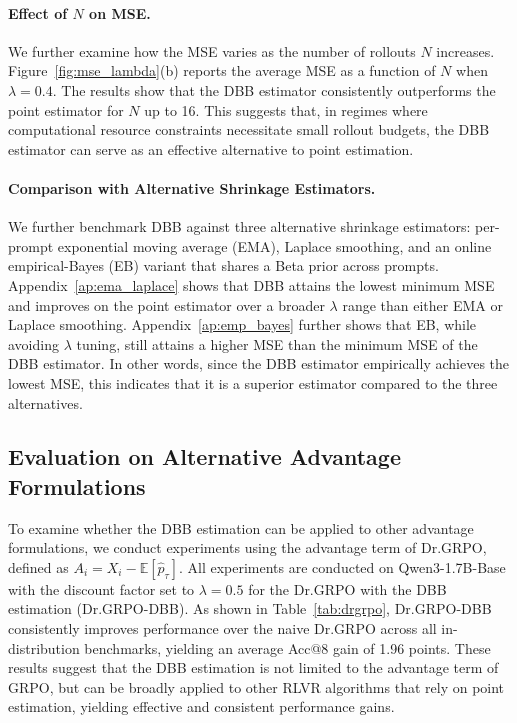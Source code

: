 \paragraph{Effect of $N$ on MSE.}
We further examine how the MSE varies as the number of rollouts $N$ increases.
Figure~\ref{fig:mse_lambda}(b) reports the average MSE as a function of $N$ when $\lambda = 0.4$.
The results show that the DBB estimator consistently outperforms the point estimator for $N$ up to 16.
This suggests that, in regimes where computational resource constraints necessitate small rollout budgets, the DBB estimator can serve as an effective alternative to point estimation.

\paragraph{Comparison with Alternative Shrinkage Estimators.}
We further benchmark DBB against three alternative shrinkage estimators: per-prompt exponential moving average (EMA), Laplace smoothing, and an online empirical-Bayes (EB) variant that shares a Beta prior across prompts.
Appendix~\ref{ap:ema_laplace} shows that DBB attains the lowest minimum MSE and improves on the point estimator over a broader $\lambda$ range than either EMA or Laplace smoothing.
Appendix~\ref{ap:emp_bayes} further shows that EB, while avoiding $\lambda$ tuning, still attains a higher MSE than the minimum MSE of the DBB estimator.
In other words, since the DBB estimator empirically achieves the lowest MSE, this indicates that it is a superior estimator compared to the three alternatives.


\subsection{Evaluation on Alternative Advantage Formulations}
\label{subsec:drgpo}

To examine whether the DBB estimation can be applied to other advantage formulations, we conduct experiments using the advantage term of Dr.GRPO, defined as $A_i = X_i - \mathbb{E}[\hat{p}_\tau]$.
All experiments are conducted on Qwen3-1.7B-Base with the discount factor set to $\lambda = 0.5$ for the Dr.GRPO with the DBB estimation (Dr.GRPO-DBB).
As shown in Table~\ref{tab:drgrpo}, Dr.GRPO-DBB consistently improves performance over the naive Dr.GRPO across all in-distribution benchmarks, yielding an average Acc@8 gain of 1.96 points.
These results suggest that the DBB estimation is not limited to the advantage term of GRPO, but can be broadly applied to other RLVR algorithms that rely on point estimation, yielding effective and consistent performance gains.
